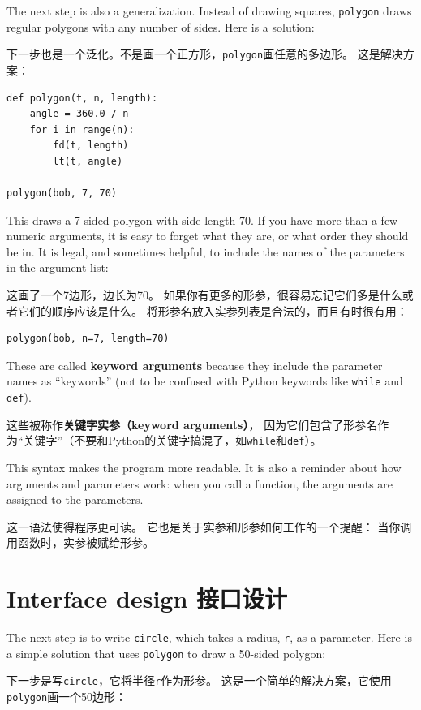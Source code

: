 \documentclass[10pt]{book}
\begin{document}
\begin{CJK}{UTF8}{gbsn}
The next step is also a generalization.  Instead of drawing
squares, {\tt polygon} draws regular polygons with any number of
sides.  Here is a solution:

下一步也是一个泛化。不是画一个正方形，{\tt polygon}画任意的多边形。
这是解决方案：

\begin{verbatim}
def polygon(t, n, length):
    angle = 360.0 / n
    for i in range(n):
        fd(t, length)
        lt(t, angle)

polygon(bob, 7, 70)
\end{verbatim}
%
This draws a 7-sided polygon with side length 70.  If you have
more than a few numeric arguments, it is easy to forget what they
are, or what order they should be in.  It is legal, and sometimes
helpful, to include the names of the parameters in the argument
list:

这画了一个7边形，边长为70。
如果你有更多的形参，很容易忘记它们多是什么或者它们的顺序应该是什么。
将形参名放入实参列表是合法的，而且有时很有用：

\begin{verbatim}
polygon(bob, n=7, length=70)
\end{verbatim}
%
These are called {\bf keyword arguments} because they include
the parameter names as ``keywords'' (not to be confused with
Python keywords like {\tt while} and {\tt def}).

这些被称作{\bf 关键字实参（keyword arguments）}，
因为它们包含了形参名作为``关键字''（不要和Python的关键字搞混了，如{\tt while}和{\tt def}）。

This syntax makes the program more readable.  It is also a reminder
about how arguments and parameters work: when you call a function, the
arguments are assigned to the parameters.

这一语法使得程序更可读。
它也是关于实参和形参如何工作的一个提醒：
当你调用函数时，实参被赋给形参。


\section{Interface design 接口设计}

The next step is to write {\tt circle}, which takes a radius,
{\tt r}, as a parameter.  Here is a simple solution that uses
{\tt polygon} to draw a 50-sided polygon:

下一步是写{\tt circle}，它将半径{\tt r}作为形参。
这是一个简单的解决方案，它使用{\tt polygon}画一个50边形：


\end{CJK}
\end{document}

